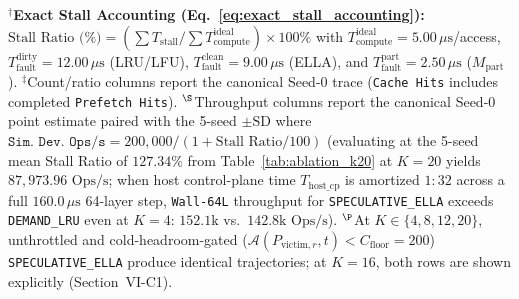 \documentclass[conference,10pt]{IEEEtran}
\begin{document}
\begin{table}[t]
\begin{minipage}{\textwidth}
$^\dagger$\textbf{Exact Stall Accounting (Eq.~\ref{eq:exact_stall_accounting}):} $\text{Stall Ratio (\%)} = (\sum T_{\text{stall}} / \sum T_{\text{compute}}^{\text{ideal}}) \times 100\%$ with $T_{\text{compute}}^{\text{ideal}} = 5.00\,\mu\text{s}$/access, $T_{\text{fault}}^{\text{dirty}} = 12.00\,\mu\text{s}$ (LRU/LFU), $T_{\text{fault}}^{\text{clean}} = 9.00\,\mu\text{s}$ (ELLA), and $T_{\text{fault}}^{\text{part}} = 2.50\,\mu\text{s}$ ($M_{\text{part}}$). $^\ddagger$Count/ratio columns report the canonical Seed-0 trace (\texttt{Cache Hits} includes completed \texttt{Prefetch Hits}). $^\S$Throughput columns report the canonical Seed-0 point estimate paired with the 5-seed $\pm\text{SD}$ where $\texttt{Sim.\ Dev.\ Ops/s} = 200{,}000 / (1 + \text{Stall Ratio}/100)$ (evaluating at the 5-seed mean Stall Ratio of $127.34\%$ from Table~\ref{tab:ablation_k20} at $K=20$ yields $87{,}973.96\text{ Ops/s}$; when host control-plane time $T_{\text{host\_cp}}$ is amortized $1:32$ across a full $160.0\,\mu\text{s}$ 64-layer step, \texttt{Wall-64L} throughput for \texttt{SPECULATIVE\_ELLA} exceeds \texttt{DEMAND\_LRU} even at $K=4$: $152.1\text{k}$ vs.\ $142.8\text{k Ops/s}$). $^\P$At $K \in \{4, 8, 12, 20\}$, unthrottled and cold-headroom-gated ($\mathcal{A}(P_{\text{victim}, r}, t) < C_{\text{floor}} = 200$) \texttt{SPECULATIVE\_ELLA} produce identical trajectories; at $K=16$, both rows are shown explicitly (Section~VI-C1).
\end{minipage}
\end{table}
\end{document}
